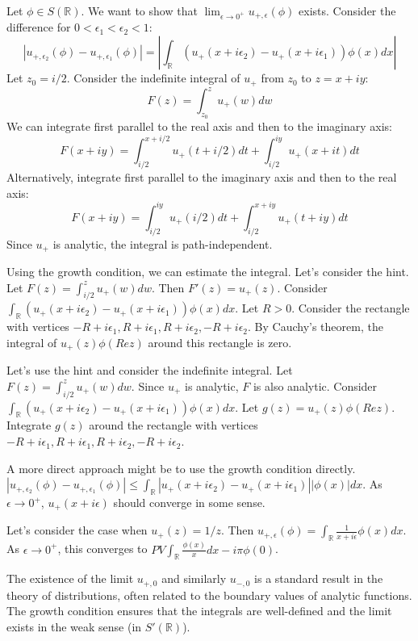 Let $\phi \in S(\mathbb{R})$. We want to show that $\lim_{\epsilon \rightarrow 0^+} u_{+,\epsilon}(\phi)$ exists. Consider the difference for $0 < \epsilon_1 < \epsilon_2 < 1$:
$$|u_{+,\epsilon_2}(\phi) - u_{+,\epsilon_1}(\phi)| = \left| \int_{\mathbb{R}} (u_+(x + i\epsilon_2) - u_+(x + i\epsilon_1)) \phi(x) dx \right|$$
Let $z_0 = i/2$. Consider the indefinite integral of $u_+$ from $z_0$ to $z = x + iy$:
$$F(z) = \int_{z_0}^z u_+(w) dw$$
We can integrate first parallel to the real axis and then to the imaginary axis:
$$F(x + iy) = \int_{i/2}^{x + i/2} u_+(t + i/2) dt + \int_{i/2}^{iy} u_+(x + it) dt$$
Alternatively, integrate first parallel to the imaginary axis and then to the real axis:
$$F(x + iy) = \int_{i/2}^{iy} u_+(i/2) dt + \int_{i/2}^{x + iy} u_+(t + iy) dt$$
Since $u_+$ is analytic, the integral is path-independent.

Using the growth condition, we can estimate the integral.  Let's consider the hint. Let $F(z) = \int_{i/2}^z u_+(w) dw$. Then $F'(z) = u_+(z)$.
Consider $\int_{\mathbb{R}} (u_+(x + i\epsilon_2) - u_+(x + i\epsilon_1)) \phi(x) dx$.
Let $R > 0$. Consider the rectangle with vertices $-R + i\epsilon_1, R + i\epsilon_1, R + i\epsilon_2, -R + i\epsilon_2$. By Cauchy's theorem, the integral of $u_+(z) \phi(Re z)$ around this rectangle is zero.

Let's use the hint and consider the indefinite integral. Let $F(z) = \int_{i/2}^z u_+(w) dw$. Since $u_+$ is analytic, $F$ is also analytic.
Consider $\int_{\mathbb{R}} (u_+(x + i\epsilon_2) - u_+(x + i\epsilon_1)) \phi(x) dx$.
Let $g(z) = u_+(z) \phi(Re z)$. Integrate $g(z)$ around the rectangle with vertices $-R + i\epsilon_1, R + i\epsilon_1, R + i\epsilon_2, -R + i\epsilon_2$.

A more direct approach might be to use the growth condition directly.
$|u_{+,\epsilon_2}(\phi) - u_{+,\epsilon_1}(\phi)| \leq \int_{\mathbb{R}} |u_+(x + i\epsilon_2) - u_+(x + i\epsilon_1)| |\phi(x)| dx$.
As $\epsilon \rightarrow 0^+$, $u_+(x + i\epsilon)$ should converge in some sense.

Let's consider the case when $u_+(z) = 1/z$. Then $u_{+,\epsilon}(\phi) = \int_{\mathbb{R}} \frac{1}{x + i\epsilon} \phi(x) dx$.
As $\epsilon \rightarrow 0^+$, this converges to $PV \int_{\mathbb{R}} \frac{\phi(x)}{x} dx - i \pi \phi(0)$.

The existence of the limit $u_{+,0}$ and similarly $u_{-,0}$ is a standard result in the theory of distributions, often related to the boundary values of analytic functions. The growth condition ensures that the integrals are well-defined and the limit exists in the weak sense (in $S'(\mathbb{R})$).

